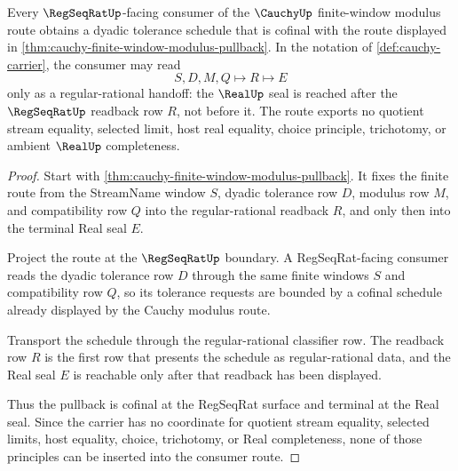 \begin{theorem}\label{thm:regular-cauchy-modulus-pullback}
Every $\RegSeqRatUp$-facing consumer of the $\CauchyUp$ finite-window modulus route obtains a dyadic tolerance schedule that is cofinal with the route displayed in \autoref{thm:cauchy-finite-window-modulus-pullback}. In the notation of \autoref{def:cauchy-carrier}, the consumer may read
$$
S,D,M,Q \longmapsto R \longmapsto E
$$
only as a regular-rational handoff: the $\RealUp$ seal is reached after the $\RegSeqRatUp$ readback row $R$, not before it. The route exports no quotient stream equality, selected limit, host real equality, choice principle, trichotomy, or ambient $\RealUp$ completeness.
\end{theorem}
\begin{proof}
Start with \autoref{thm:cauchy-finite-window-modulus-pullback}. It fixes the finite route from the StreamName window $S$, dyadic tolerance row $D$, modulus row $M$, and compatibility row $Q$ into the regular-rational readback $R$, and only then into the terminal Real seal $E$.

Project the route at the $\RegSeqRatUp$ boundary. A RegSeqRat-facing consumer reads the dyadic tolerance row $D$ through the same finite windows $S$ and compatibility row $Q$, so its tolerance requests are bounded by a cofinal schedule already displayed by the Cauchy modulus route.

Transport the schedule through the regular-rational classifier row. The readback row $R$ is the first row that presents the schedule as regular-rational data, and the Real seal $E$ is reachable only after that readback has been displayed.

Thus the pullback is cofinal at the RegSeqRat surface and terminal at the Real seal. Since the carrier has no coordinate for quotient stream equality, selected limits, host equality, choice, trichotomy, or Real completeness, none of those principles can be inserted into the consumer route.
\end{proof}

